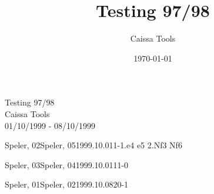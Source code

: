 \documentclass[twocolumn,a4paper,10pt]{report}
\title{Testing 97/98}
\author{Caissa Tools}
\date{\today{}}
\begin{document}
\begin{titlepage}
  \begin{center}
    \huge Testing 97/98 \\
    \vspace{1in}
    \large Caissa Tools \\
    \vspace{1in}
    \large 01/10/1999 - 08/10/1999 \\
  \end{center}
\end{titlepage}

\begin{chessgame}{Speler, 02}{Speler, 05}{1999.10.01}{1}{\textonehalf-\textonehalf}{}{1.e4 e5 2.Nf3 Nf6}\end{chessgame}
\begin{chessempty}{Speler, 03}{Speler, 04}{1999.10.01}{1}{1-0}{}\end{chessempty}
\begin{chessempty}{Speler, 01}{Speler, 02}{1999.10.08}{2}{0-1}{}\end{chessempty}
\end{document}
